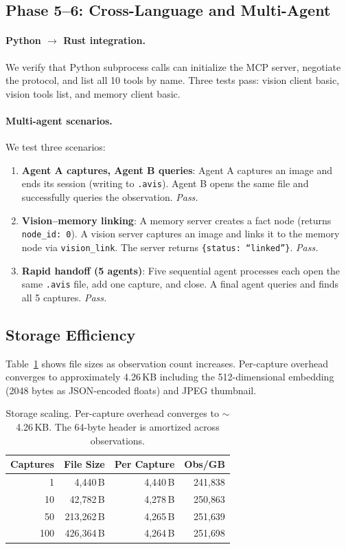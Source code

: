 \documentclass[10pt, twocolumn]{article}
\begin{document}
\subsection{Phase 5--6: Cross-Language and Multi-Agent}

\paragraph{Python $\to$ Rust integration.} We verify that Python subprocess calls can initialize the MCP server, negotiate the protocol, and list all 10 tools by name. Three tests pass: vision client basic, vision tools list, and memory client basic.

\paragraph{Multi-agent scenarios.} We test three scenarios:

\begin{enumerate}[nosep,leftmargin=*]
\item \textbf{Agent A captures, Agent B queries}: Agent A captures an image and ends its session (writing to \texttt{.avis}). Agent B opens the same file and successfully queries the observation. \textit{Pass.}
\item \textbf{Vision--memory linking}: A memory server creates a fact node (returns \texttt{node\_id: 0}). A vision server captures an image and links it to the memory node via \texttt{vision\_link}. The server returns \texttt{\{status: ``linked''\}}. \textit{Pass.}
\item \textbf{Rapid handoff (5 agents)}: Five sequential agent processes each open the same \texttt{.avis} file, add one capture, and close. A final agent queries and finds all 5 captures. \textit{Pass.}
\end{enumerate}

\subsection{Storage Efficiency}

Table~\ref{tab:storage} shows file sizes as observation count increases. Per-capture overhead converges to approximately 4.26\,KB including the 512-dimensional embedding (2048 bytes as JSON-encoded floats) and JPEG thumbnail.

\begin{table}[t]
\caption{Storage scaling. Per-capture overhead converges to $\sim$4.26\,KB. The 64-byte header is amortized across observations.}
\label{tab:storage}
\centering
\small
\begin{tabular}{@{}rrrr@{}}
\toprule
\textbf{Captures} & \textbf{File Size} & \textbf{Per Capture} & \textbf{Obs/GB} \\
\midrule
1 & 4{,}440\,B & 4{,}440\,B & 241{,}838 \\
10 & 42{,}782\,B & 4{,}278\,B & 250{,}863 \\
50 & 213{,}262\,B & 4{,}265\,B & 251{,}639 \\
100 & 426{,}364\,B & 4{,}264\,B & 251{,}698 \\
\bottomrule
\end{tabular}
\end{table}
\end{document}
